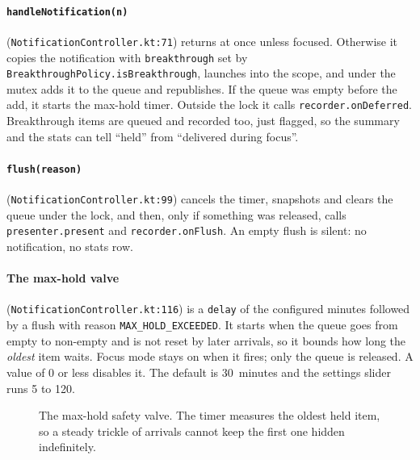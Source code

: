 \documentclass[10pt,a4paper]{article}
\newcommand{\file}[1]{\texttt{\small #1}}          %
\newcommand{\code}[1]{\texttt{#1}}                  %
\newcommand{\state}[1]{\textsc{\small #1}}          %
\begin{document}
\paragraph{\code{handleNotification(n)}} (\file{NotificationController.kt:71}) returns at once
unless focused. Otherwise it copies the notification with \code{breakthrough} set by
\code{BreakthroughPolicy.isBreakthrough}, launches into the scope, and under the mutex adds it to
the queue and republishes. If the queue was empty before the add, it starts the max-hold timer.
Outside the lock it calls \code{recorder.onDeferred}. Breakthrough items are queued and recorded
too, just flagged, so the summary and the stats can tell ``held'' from ``delivered during focus''.

\paragraph{\code{flush(reason)}} (\file{NotificationController.kt:99}) cancels the timer, snapshots
and clears the queue under the lock, and then, only if something was released, calls
\code{presenter.present} and \code{recorder.onFlush}. An empty flush is silent: no notification,
no stats row.

\paragraph{The max-hold valve} (\file{NotificationController.kt:116}) is
a \code{delay} of the configured minutes followed by a flush with reason
\code{MAX\_HOLD\_EXCEEDED}. It starts when the
queue goes from empty to non-empty and is not reset by later arrivals, so it bounds how long the
\emph{oldest} item waits. Focus mode stays on when it fires; only the queue is released. A value of
0 or less disables it. The default is 30~minutes and the settings slider runs 5 to 120.

\begin{figure}[htbp]\centering
{}
\caption{The max-hold safety valve. The timer measures the oldest held item, so a steady trickle of
arrivals cannot keep the first one hidden indefinitely.}\label{fig:maxhold}
\end{figure}
\end{document}
